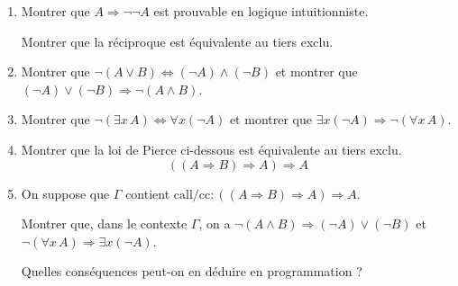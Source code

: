 \documentclass{article}
\begin{document}
\begin{enumerate}
\item Montrer que \(A \Rightarrow \neg \neg A\) est prouvable en logique intuitionniste.

  Montrer que la réciproque est équivalente au tiers exclu.
\item Montrer que \(\neg (A \vee B) \Leftrightarrow (\neg A) \wedge (\neg B)\)
et montrer que \((\neg A) \vee (\neg B) \Rightarrow \neg (A \wedge B)\).
\item Montrer que \(\neg (\exists x \, A) \Leftrightarrow \forall x (\neg A)\)
et montrer que \(\exists x (\neg A) \Rightarrow \neg (\forall x \, A)\).
\item Montrer que la loi de Pierce ci-dessous est équivalente au tiers exclu.
  \[((A \Rightarrow B) \Rightarrow A) \Rightarrow A\]
\item On suppose que \(\Gamma\) contient \(\text{call/cc} : ((A \Rightarrow B) \Rightarrow A) \Rightarrow A\).

Montrer que, dans le contexte \(\Gamma\), on a \(\neg (A \wedge B) \Rightarrow (\neg A) \vee (\neg B)\)
et \(\neg (\forall x \, A) \Rightarrow \exists x (\neg A)\).

  Quelles conséquences peut-on en déduire en programmation ?
\end{enumerate}
\end{document}

